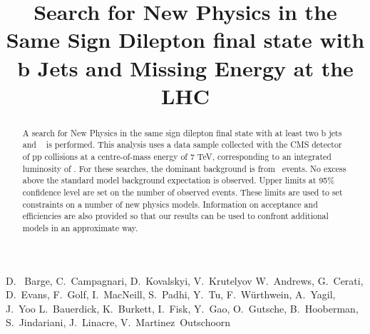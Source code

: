 \documentclass{cmspaper}
\begin{document}
%
\begin{titlepage}
\title{Search for New Physics in the Same Sign Dilepton final state with b Jets and Missing Energy at the LHC}

  \begin{Authlist}
    D.~ Barge, C.~Campagnari, D.~Kovalskyi, V.~Krutelyov
    W.~Andrews, G.~Cerati, D.~Evans, F.~Golf, I.~MacNeill, S.~Padhi, Y.~Tu, F.~W\"urthwein, A.~Yagil, J.~Yoo
    L.~Bauerdick, K.~Burkett, I.~Fisk, Y.~Gao, O.~Gutsche, B.~Hooberman, S.~Jindariani, J.~Linacre,
    V.~Martinez~Outschoorn
  \end{Authlist}

\begin{abstract}
A search for New Physics in the same sign dilepton final state with at least two b jets 
and \met~ is performed. 
This analysis uses a data sample collected with the CMS detector
of pp collisions at a centre-of-mass energy of 7 TeV, corresponding to an integrated
luminosity of \intLumi. 
For these searches, the dominant background is from \ttbar\ events. 
No excess above the standard model background expectation is observed.
Upper limits at 95\% confidence level are set on the number of observed events.
These limits are used to set constraints on a number of new physics models.
Information on acceptance and efficiencies are also provided so that our 
results can be used to confront additional models in an approximate way.
\end{abstract}
\end{titlepage}


%
%











\clearpage


\clearpage
\appendix


\end{document}
